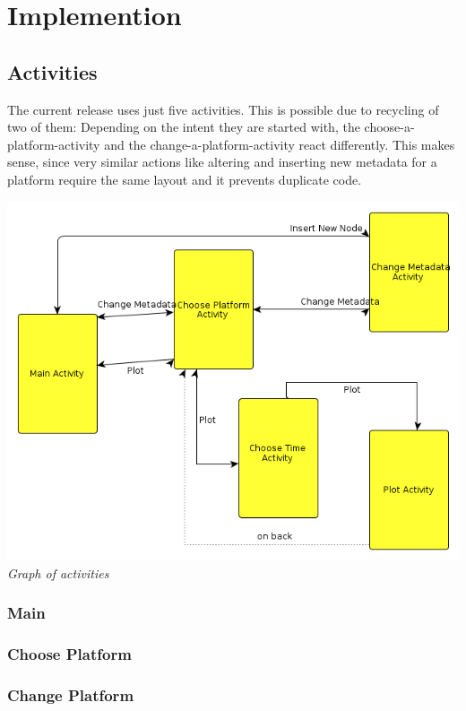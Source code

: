 \documentclass[11pt,oneside,a4paper]{scrartcl}
\begin{document}
\section{Implemention}
\subsection{Activities}
The current release uses just five activities. This is possible due to recycling of two of them: Depending on the intent they are started with, the choose-a-platform-activity and the change-a-platform-activity react differently. This makes sense, since very similar actions like altering and inserting new metadata for a platform require the same layout and it prevents duplicate code.

\begin{center}
\includegraphics[scale=0.6]{picture/sensordata_activities.png}\\
\textit{Graph of activities}
\end{center}

\subsubsection{Main}

\subsubsection{Choose Platform}

\subsubsection{Change Platform}
\end{document}
